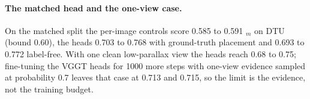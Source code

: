 \begin{table}[h]
\centering
\caption{\textbf{Fused point cloud at three views.} Accuracy at the given coverage, the head's accuracy and F1 change against native confidence (paired sign-flip $p$ over scenes), and the single-view share of the kept points.}
\label{tab:down3}
\scriptsize
\setlength{\tabcolsep}{2.5pt}
\resizebox{\textwidth}{!}{}
\end{table}

\paragraph{The matched head and the one-view case.}
On the matched split the per-image controls score 0.585 to 0.591 \auroc$_m$ on DTU (bound 0.60), the heads 0.703 to 0.768 with ground-truth placement and 0.693 to 0.772 label-free. With one clean low-parallax view the heads reach 0.68 to 0.75; fine-tuning the VGGT heads for 1000 more steps with one-view evidence sampled at probability 0.7 leaves that case at 0.713 and 0.715, so the limit is the evidence, not the training budget.

